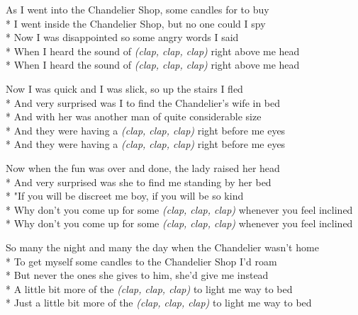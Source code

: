 \begin{SongText}
    \begin{SongVerse}
        As I went into the Chandelier Shop, some candles for to buy\\*%
        I went inside the Chandelier Shop, but no one could I spy\\*%
        Now I was disappointed so some angry words I said\\*%
        When I heard the sound of \emph{(clap, clap, clap)} right above me head\\*%
        When I heard the sound of \emph{(clap, clap, clap)} right above me head
    \end{SongVerse}
    \begin{SongVerse}
        Now I was quick and I was slick, so up the stairs I fled\\*%
        And very surprised was I to find the Chandelier's wife in bed\\*%
        And with her was another man of quite considerable size\\*%
        And they were having a \emph{(clap, clap, clap)} right before me eyes\\*%
        And they were having a \emph{(clap, clap, clap)} right before me eyes
    \end{SongVerse}
    \begin{SongVerse}
        Now when the fun was over and done, the lady raised her head\\*%
        And very surprised was she to find me standing by her bed\\*%
        "If you will be discreet me boy, if you will be so kind\\*%
        Why don't you come up for some \emph{(clap, clap, clap)} whenever you feel inclined\\*%
        Why don't you come up for some \emph{(clap, clap, clap)} whenever you feel inclined
    \end{SongVerse}
    \begin{SongVerse}
        So many the night and many the day when the Chandelier wasn't home\\*%
        To get myself some candles to the Chandelier Shop I'd roam\\*%
        But never the ones she gives to him, she'd give me instead\\*%
        A little bit more of the \emph{(clap, clap, clap)} to light me way to bed\\*%
        Just a little bit more of the \emph{(clap, clap, clap)} to light me way to bed

\end{SongVerse}
\end{SongText}
